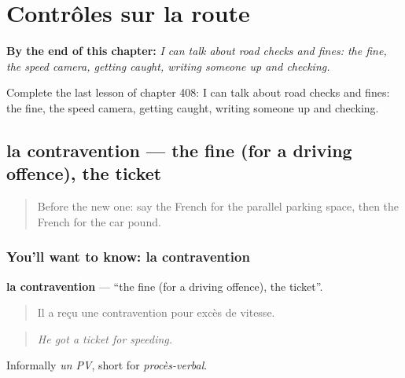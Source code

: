 
\chapter{Contrôles sur la route}
\label{ch:fr-controles-sur-la-route}

\begin{chapteropening}
\textbf{By the end of this chapter:} \emph{I can talk about road checks and fines: the fine, the speed camera, getting caught, writing someone up and checking.}

Complete the last lesson of chapter 408: I can talk about road checks and fines: the fine, the speed camera, getting caught, writing someone up and checking.
\end{chapteropening}

\section[la contravention]{la contravention — the fine (for a driving offence), the ticket}

\label{lesson:FR-C408-contravention}



\begin{quote}
Before the new one: say the French for the parallel parking space, then the French for the car pound.
\end{quote}

\subsection*{You'll want to know: la contravention}
\textbf{la contravention} — \textquotedblleft{}the fine (for a driving offence), the ticket\textquotedblright{}.

\begin{quote}
Il a reçu une contravention pour excès de vitesse.
\end{quote}

\begin{quote}
\emph{He got a ticket for speeding.}
\end{quote}

Informally \emph{un PV}, short for \emph{procès-verbal}.


